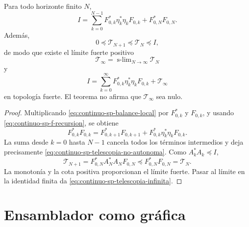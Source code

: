 \begin{theorem}
\label{thm:continuo-sp-telescopia-no-autonoma}
Para todo horizonte finito \(N\),
\begin{equation}
\label{eq:continuo-sp-telescopia-no-autonoma}
 \boxed{
 I=\sum_{k=0}^{N-1}
 F_{0,k}^*\eta_k^*\eta_kF_{0,k}
 +F_{0,N}^*F_{0,N}.}
\end{equation}
Además,
\[
 0\preceq\mathcal T_{N+1}
 \preceq\mathcal T_N\preceq I,
\]
de modo que existe el límite fuerte positivo
\[
 \mathcal T_\infty
 =\operatorname{s-lim}_{N\to\infty}\mathcal T_N
\]
y
\begin{equation}
\label{eq:continuo-sp-telescopia-infinita}
 I=\sum_{k=0}^{\infty}
 F_{0,k}^*\eta_k^*\eta_kF_{0,k}
 +\mathcal T_\infty
\end{equation}
en topología fuerte. El teorema no afirma que
\(\mathcal T_\infty\) sea nulo.
\end{theorem}

\begin{proof}
Multiplicando \eqref{eq:continuo-sp-balance-local} por
\(F_{0,k}^*\) y \(F_{0,k}\), y usando
\eqref{eq:continuo-sp-f-recursion}, se obtiene
\[
 F_{0,k}^*F_{0,k}
 =F_{0,k+1}^*F_{0,k+1}
  +F_{0,k}^*\eta_k^*\eta_kF_{0,k}.
\]
La suma desde \(k=0\) hasta \(N-1\) cancela todos los términos
intermedios y deja precisamente
\eqref{eq:continuo-sp-telescopia-no-autonoma}. Como
\(A_k^*A_k\preceq I\),
\[
 \mathcal T_{N+1}
 =F_{0,N}^*A_N^*A_NF_{0,N}
 \preceq F_{0,N}^*F_{0,N}=\mathcal T_N.
\]
La monotonía y la cota positiva proporcionan el límite fuerte. Pasar al
límite en la identidad finita da
\eqref{eq:continuo-sp-telescopia-infinita}.
\end{proof}

\section{Ensamblador como gráfica}

